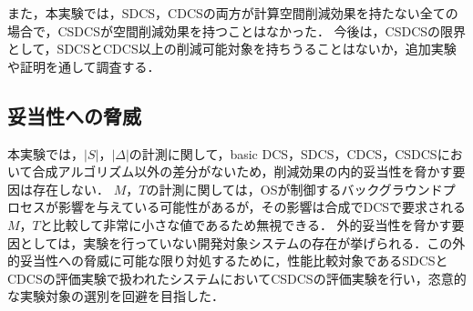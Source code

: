 また，本実験では，SDCS，CDCSの両方が計算空間削減効果を持たない全ての場合で，CSDCSが空間削減効果を持つことはなかった．
今後は，CSDCSの限界として，SDCSとCDCS以上の削減可能対象を持ちうることはないか，追加実験や証明を通して調査する．

\subsection{妥当性への脅威}
本実験では，$|S|$，$|\Delta|$の計測に関して，basic DCS，SDCS，CDCS，CSDCSにおいて合成アルゴリズム以外の差分がないため，削減効果の内的妥当性を脅かす要因は存在しない．
$M$，$T$の計測に関しては，OSが制御するバックグラウンドプロセスが影響を与えている可能性があるが，その影響は合成でDCSで要求される$M$，$T$と比較して非常に小さな値であるため無視できる．
外的妥当性を脅かす要因としては，実験を行っていない開発対象システムの存在が挙げられる．この外的妥当性への脅威に可能な限り対処するために，性能比較対象であるSDCSとCDCSの評価実験で扱われたシステムにおいてCSDCSの評価実験を行い，恣意的な実験対象の選別を回避を目指した．






